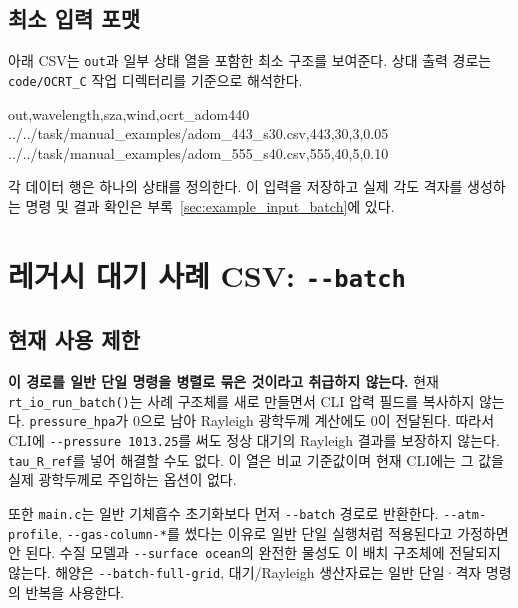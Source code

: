 \subsection{최소 입력 포맷}
\label{sec:auto:08_input_formats:2.7}
\label{sec:input_batch_sample}
아래 CSV는 \texttt{out}과 일부 상태 열을 포함한 최소 구조를 보여준다. 상대 출력 경로는 \texttt{code/\allowbreak{}OCRT\_\allowbreak{}C} 작업 디렉터리를 기준으로 해석한다.

\begin{ManualCode}
out,wavelength,sza,wind,ocrt_adom440
../../task/manual_examples/adom_443_s30.csv,443,30,3,0.05
../../task/manual_examples/adom_555_s40.csv,555,40,5,0.10
\end{ManualCode}

각 데이터 행은 하나의 상태를 정의한다. 이 입력을 저장하고 실제 각도 격자를 생성하는 명령 및 결과 확인은 부록~\ref{sec:example_input_batch}에 있다.

\section{레거시 대기 사례 CSV: \texttt{-\allowbreak{}-\allowbreak{}batch}}
\label{sec:auto:08_input_formats:3}
\subsection{현재 사용 제한}
\label{sec:auto:08_input_formats:3.1}
\textbf{이 경로를 일반 단일 명령을 병렬로 묶은 것이라고 취급하지 않는다.} 현재 \texttt{rt\_\allowbreak{}io\_\allowbreak{}run\_\allowbreak{}batch()}는 사례 구조체를 새로 만들면서 CLI 압력 필드를 복사하지 않는다. \texttt{pressure\_\allowbreak{}hpa}가 0으로 남아 Rayleigh 광학두께 계산에도 0이 전달된다. 따라서 CLI에 \texttt{-\allowbreak{}-\allowbreak{}pressure 1013.\allowbreak{}25}를 써도 정상 대기의 Rayleigh 결과를 보장하지 않는다. \texttt{tau\_\allowbreak{}R\_\allowbreak{}ref}를 넣어 해결할 수도 없다. 이 열은 비교 기준값이며 현재 CLI에는 그 값을 실제 광학두께로 주입하는 옵션이 없다.

또한 \texttt{main.\allowbreak{}c}는 일반 기체흡수 초기화보다 먼저 \texttt{-\allowbreak{}-\allowbreak{}batch} 경로로 반환한다. \texttt{-\allowbreak{}-\allowbreak{}atm-\allowbreak{}profile}, \texttt{-\allowbreak{}-\allowbreak{}gas-\allowbreak{}column-\allowbreak{}*}를 썼다는 이유로 일반 단일 실행처럼 적용된다고 가정하면 안 된다. 수질 모델과 \texttt{-\allowbreak{}-\allowbreak{}surface ocean}의 완전한 물성도 이 배치 구조체에 전달되지 않는다. 해양은 \texttt{-\allowbreak{}-\allowbreak{}batch-\allowbreak{}full-\allowbreak{}grid}, 대기/Rayleigh 생산자료는 일반 단일·격자 명령의 반복을 사용한다.

